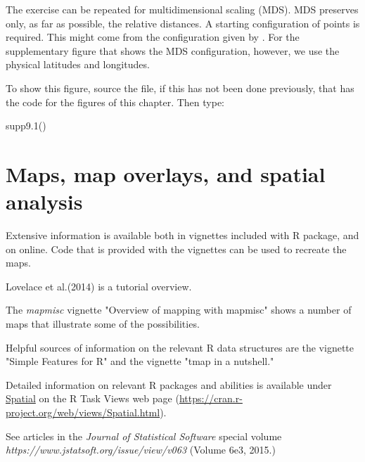 The exercise can be repeated for multidimensional scaling (MDS). MDS
preserves only, as far as possible, the relative distances.  A
starting configuration of points is required.  This might come from
the configuration given by .  For the supplementary
figure  that shows the MDS configuration, however, we
use the physical latitudes and longitudes.

To show this figure, source the file, if this has not been done
previously, that has the code for the figures of this chapter. Then
type:
\begin{Schunk}
\begin{Sinput}
supp9.1()
\end{Sinput}
\end{Schunk}

\section{Maps, map overlays, and spatial analysis}

Extensive information is available both in vignettes included
with R package, and on online.  Code that is provided with
the vignettes can be used to recreate the maps.

\begin{itemizz}
\item[] Lovelace et al.(2014) is a tutorial overview.
\item[] The {\em mapmisc} vignette "Overview of mapping with mapmisc"
shows a number of maps that illustrate some of the possibilities.
\item[] Helpful sources of information on the relevant R data structures
are the  vignette "Simple Features for R" and the  
vignette "tmap in a nutshell."
\item[] Detailed information on relevant R packages and abilities
is available under \underline{Spatial} on the R Task Views web page
  (\url{https://cran.r-project.org/web/views/Spatial.html}).
  \item[] See articles in the {\em Journal of Statistical Software}
  special volume {\em https://www.jstatsoft.org/issue/view/v063}
  (Volume 6e3, 2015.)
\end{itemizz}

